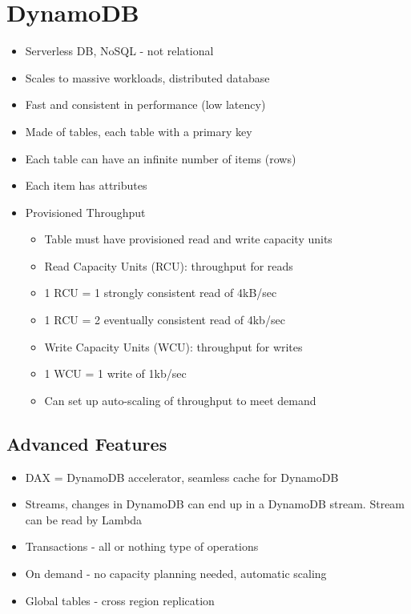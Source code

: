 \documentclass[]{scrartcl}
\begin{document}
\section{DynamoDB}
\begin{itemize}
	\item Serverless DB, NoSQL - not relational
	\item Scales to massive workloads, distributed database
	\item Fast and consistent in performance (low latency)
	\item Made of tables, each table with a primary key
	\item Each table can have an infinite number of items (rows)
	\item Each item has attributes
	\item Provisioned Throughput
	\begin{itemize}
		\item Table must have provisioned read and write capacity units
		\item Read Capacity Units (RCU): throughput for reads
		\item 1 RCU = 1 strongly consistent read of 4kB/sec
		\item 1 RCU = 2 eventually consistent read of 4kb/sec
		\item Write Capacity Units (WCU): throughput for writes
		\item 1 WCU = 1 write of 1kb/sec
		\item Can set up auto-scaling of throughput to meet demand
	\end{itemize}
\end{itemize}

\subsection{Advanced Features}
\begin{itemize}
	\item DAX = DynamoDB accelerator, seamless cache for DynamoDB
	\item Streams, changes in DynamoDB can end up in a DynamoDB stream. Stream can be read by Lambda
	\item Transactions - all or nothing type of operations
	\item On demand - no capacity planning needed, automatic scaling
	\item Global tables - cross region replication
\end{itemize}
\end{document}
